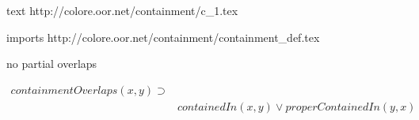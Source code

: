 text http://colore.oor.net/containment/c_1.tex

imports http://colore.oor.net/containment/containment_def.tex

no partial overlaps

\begin{align*}
containmentOverlaps(x,y) \supset \\
& containedIn(x,y) \vee properContainedIn(y,x)
\end{align*}
